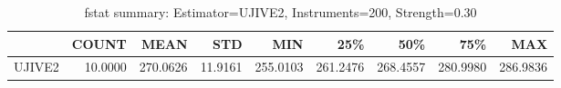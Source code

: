 \begin{table}[ht]
\centering
\caption{fstat summary: Estimator=UJIVE2, Instruments=200, Strength=0.30}
\begin{tabular}{lrrrrrrrr}
\toprule
 & COUNT & MEAN & STD & MIN & 25\% & 50\% & 75\% & MAX \\
\midrule
UJIVE2 & 10.0000 & 270.0626 & 11.9161 & 255.0103 & 261.2476 & 268.4557 & 280.9980 & 286.9836 \\
\bottomrule
\end{tabular}
\end{table}
